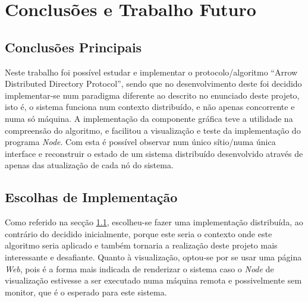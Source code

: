 \chapter{Conclusões e Trabalho Futuro}
\label{chap:conc-trab-futuro}

\section{Conclusões Principais}
\label{sec:conc-princ}

Neste trabalho foi possível estudar e implementar o protocolo/algoritmo ``Arrow Distributed Directory Protocol'', sendo que no desenvolvimento deste foi decidido implementar-se num paradigma diferente ao descrito no enunciado deste projeto, isto é, o sistema funciona num contexto distribuído, e não apenas concorrente e numa só máquina. 
A implementação da componente gráfica teve a utilidade na compreensão do algoritmo, e facilitou a visualização e teste da implementação do programa \emph{Node}. Com esta é possível observar num único sítio/numa única interface e reconstruir o estado de um sistema distribuído desenvolvido através de apenas das atualização de cada nó do sistema.




\section{Escolhas de Implementação}
\label{sec:escolhas-implementacao}
Como referido na secção \ref{sec:conc-princ}, escolheu-se fazer uma implementação distribuída, ao contrário do decidido inicialmente, porque este seria o contexto onde este algoritmo seria aplicado e também tornaria a realização deste projeto mais interessante e desafiante.
Quanto à visualização, optou-se por se usar uma página \emph{Web}, pois é a forma mais indicada de renderizar o sistema caso o \emph{Node} de visualização estivesse a ser executado numa máquina remota e possivelmente sem monitor, que é o esperado para este sistema.



